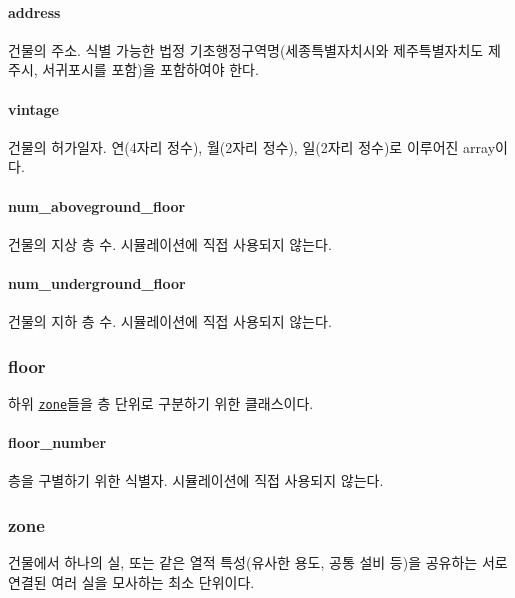 \paragraph{address} 건물의 주소. 식별 가능한 법정 기초행정구역명(세종특별자치시와 제주특별자치도 제주시, 서귀포시를 포함)을 포함하여야 한다. 

\paragraph{vintage} 건물의 허가일자. 연(4자리 정수), 월(2자리 정수), 일(2자리 정수)로 이루어진 array이다.

\paragraph{num\_aboveground\_floor} 건물의 지상 층 수. 시뮬레이션에 직접 사용되지 않는다.

\paragraph{num\_underground\_floor} 건물의 지하 층 수. 시뮬레이션에 직접 사용되지 않는다.

\subsubsection{floor} \label{subsubsection:ioref:floor}
하위 \hyperref[subsubsection:ioref:zone]{\texttt{zone}}들을 층 단위로 구분하기 위한 클래스이다.

\jsontable{floor}{
  \jsontablerow{floor_number}{\TypeTag{I}}{\ReqTag{O}}{0}{}{}{}
  \jsontablerow{zones}{[ \hyperref[subsubsection:ioref:zone]{\texttt{zone}} ]}{\ReqTag{R}}{}{}{[1,$Inf$)}{}
}

\paragraph{floor\_number} 층을 구별하기 위한 식별자. 시뮬레이션에 직접 사용되지 않는다.

\subsubsection{zone} \label{subsubsection:ioref:zone}
건물에서 하나의 실, 또는 같은 열적 특성(유사한 용도, 공통 설비 등)을 공유하는 서로 연결된 여러 실을 모사하는 최소 단위이다.

